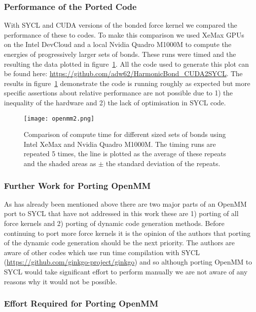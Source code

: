 \documentclass[../main]{subfiles}
\begin{document}
\subsubsection{Performance of the Ported Code}\label{sec:openmm_performance}


With SYCL and CUDA versions of the bonded force kernel we compared the performance of these to codes.
To make this comparison we used XeMax GPUs on the Intel DevCloud and a local Nvidia Quadro M1000M to compute the energies of progressively larger sets of bonds.
These runs were timed and the resulting the data plotted in figure~\ref{fig:openmm}.
All the code used to generate this plot can be found here: \url{https://github.com/adw62/HarmonicBond_CUDA2SYCL}.
The results in figure~\ref{fig:openmm} demonstrate the code is running roughly as expected but more specific assertions about relative performance are not possible due to 1) the inequality of the hardware and 2) the lack of optimisation in SYCL code.

\begin{figure}[!htbp]
	\caption{Comparison of compute time for different sized sets of bonds using Intel XeMax and Nvidia Quadro M1000M. The timing runs are repeated 5 times, the line is plotted as the average of these repeats and the shaded areas as $\pm$ the standard deviation of the repeats.}
	\texttt{[image: openmm2.png]}
	\label{fig:openmm}
\end{figure}

\subsubsection{Further Work for Porting OpenMM}\label{sec:openmm_furtherwork}

As has already been mentioned above there are two major parts of an OpenMM port to SYCL that have not addressed in this work these are 1) porting of all force kernels and 2) porting of dynamic code generation methods.
Before continuing to port more force kernels it is the opinion of the authors that porting of the dynamic code generation should be the next priority.
The authors are aware of other codes which use run time compilation with SYCL (\url{https://github.com/ginkgo-project/ginkgo}) and so although porting OpenMM to SYCL would take significant effort to perform manually we are not aware of any reasons why it would not be possible.


\subsubsection{Effort Required for Porting OpenMM}\label{sec:openmm_effort}
\end{document}
